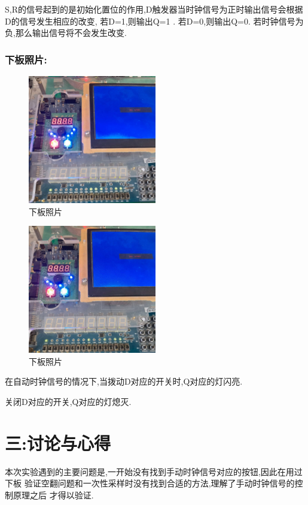 \documentclass{article}
\begin{document}
S,R的信号起到的是初始化置位的作用,D触发器当时钟信号为正时输出信号会根据D的信号发生相应的改变,
若D=1,则输出Q=1 . 若D=0,则输出Q=0. 若时钟信号为负,那么输出信号将不会发生改变.

\subsubsection*{下板照片:}

\begin{figure}[H]
    \centering
    \includegraphics[width=0.5\textwidth]{lab9p/25.jpg}
    \caption{\label{Lab9}下板照片}
    \end{figure}

    \begin{figure}[H]
    \centering
    \includegraphics[width=0.5\textwidth]{lab9p/26.jpg}
    \caption{\label{Lab9}下板照片}
    \end{figure}

在自动时钟信号的情况下,当拨动D对应的开关时,Q对应的灯闪亮.

关闭D对应的开关,Q对应的灯熄灭.


\section*{三:讨论与心得}

本次实验遇到的主要问题是,一开始没有找到手动时钟信号对应的按钮,因此在用过下板
验证空翻问题和一次性采样时没有找到合适的方法,理解了手动时钟信号的控制原理之后
才得以验证.
\end{document}

